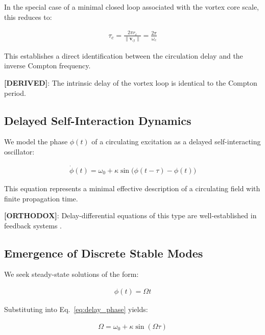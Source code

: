\documentclass[11pt]{article}
\theoremstyle{definition}
\theoremstyle{plain}
\theoremstyle{remark}
\newcommand{\rc}{{r_c}}
\newcommand{\vnorm}{\lVert \mathbf{v}_{\!\boldsymbol{\circlearrowleft}} \rVert}
\begin{document}
        In the special case of a minimal closed loop associated with the vortex core scale, this reduces to:
        
        \begin{align}
            \tau_c = \frac{2\pi \rc}{\vnorm} = \frac{2\pi}{\omega_c}
            \label{eq:compton_delay}
        \end{align}
        
        This establishes a direct identification between the circulation delay and the inverse Compton frequency.
        
        \textbf{[DERIVED]}: The intrinsic delay of the vortex loop is identical to the Compton period.
    
    \subsection{Delayed Self-Interaction Dynamics}
        
        We model the phase $\phi(t)$ of a circulating excitation as a delayed self-interacting oscillator:
        
        \begin{align}
            \dot{\phi}(t) = \omega_0 + \kappa \sin\big(\phi(t - \tau) - \phi(t)\big)
            \label{eq:delay_phase}
        \end{align}
        
        This equation represents a minimal effective description of a circulating field with finite propagation time.
        
        \textbf{[ORTHODOX]}: Delay-differential equations of this type are well-established in feedback systems \cite{SST_delay_basic}.
    
    \subsection{Emergence of Discrete Stable Modes}
        
        We seek steady-state solutions of the form:
        
        \begin{align}
            \phi(t) = \Omega t
        \end{align}
        
        Substituting into Eq.~\ref{eq:delay_phase} yields:
        
        \begin{align}
            \Omega = \omega_0 + \kappa \sin(\Omega \tau)
            \label{eq:mode_condition}
        \end{align}
        
\end{document}
